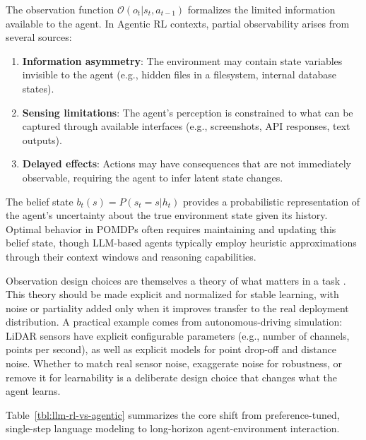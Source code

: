 The observation function $\mathcal{O}(o_t | s_t, a_{t-1})$ formalizes the limited information available to the agent. In Agentic RL contexts, partial observability arises from several sources:

\begin{enumerate}
    \item \textbf{Information asymmetry}: The environment may contain state variables invisible to the agent (e.g., hidden files in a filesystem, internal database states).

    \item \textbf{Sensing limitations}: The agent's perception is constrained to what can be captured through available interfaces (e.g., screenshots, API responses, text outputs).

    \item \textbf{Delayed effects}: Actions may have consequences that are not immediately observable, requiring the agent to infer latent state changes.

\end{enumerate}
The belief state $b_t(s) = P(s_t = s | h_t)$ provides a probabilistic representation of the agent's uncertainty about the true environment state given its history. Optimal behavior in POMDPs often requires maintaining and updating this belief state, though LLM-based agents typically employ heuristic approximations through their context windows and reasoning capabilities.

Observation design choices are themselves a theory of what matters in a task \citep{abaka2025designing}. This theory should be made explicit and normalized for stable learning, with noise or partiality added only when it improves transfer to the real deployment distribution. A practical example comes from autonomous-driving simulation: LiDAR sensors have explicit configurable parameters (e.g., number of channels, points per second), as well as explicit models for point drop-off and distance noise. Whether to match real sensor noise, exaggerate noise for robustness, or remove it for learnability is a deliberate design choice that changes what the agent learns.

Table~\ref{tbl:llm-rl-vs-agentic} summarizes the core shift from preference-tuned, single-step language modeling to long-horizon agent-environment interaction.

